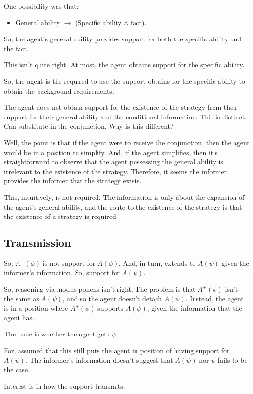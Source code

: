 \documentclass[10pt]{article}
\begin{document}
\begin{note}
  One possibility was that:
  \begin{itemize}
  \item General ability \(\rightarrow\) (Specific ability \(\land\) fact).
  \end{itemize}
  So, the agent's general ability provides support for both the specific ability and the fact.

  This isn't quite right.
  At most, the agent obtains support for the specific ability.

  So, the agent is the required to use the support obtains for the specific ability to obtain the background requirements.

  The agent does not obtain support for the existence of the strategy from their support for their general ability and the conditional information.
  This is distinct.
  Can substitute in the conjunction.
  Why is this different?

  Well, the point is that if the agent were to receive the conjunction, then the agent would be in a position to simplify.
  And, if the agent simplifies, then it's straightforward to observe that the agent possessing the general ability is irrelevant to the existence of the strategy.
  Therefore, it seems the informer provides the informer that the strategy exists.

  This, intuitively, is not required.
  The information is only about the expansion of the agent's general ability, and the route to the existence of the strategy is that the existence of a strategy is required.
\end{note}

\subsection{Transmission}
\label{sec:transmission-overview}

\begin{note}
  So, \(A^{+}(\phi)\) is not support for \(A(\phi)\).
  And, in turn, extends to \(A(\psi)\) given the informer's information.
  So, support for \(A(\psi)\).

  So, reasoning via modus ponens isn't right.
  The problem is that \(A^{+}(\phi)\) isn't the same as \(A(\psi)\), and so the agent doesn't detach \(A(\psi)\).
  Instead, the agent is in a position where \(A^{+}(\phi)\) supports \(A(\psi)\), given the information that the agent has.

  The issue is whether the agent gets \(\psi\).

  For, assumed that this still puts the agent in position of having support for \(A(\psi)\).
  The informer's information doesn't suggest that \(A(\psi)\) nor \(\psi\) fails to be the case.

  Interest is in how the support transmits.
\end{note}
\end{document}
